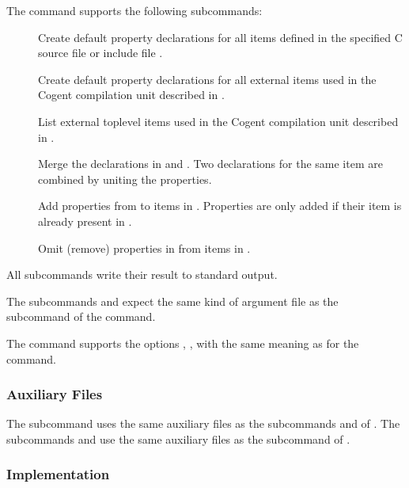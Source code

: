 The  command supports the following subcommands:
\begin{description}
\item[] Create default property declarations for all items defined in the specified C source file
or include file . 

\item[] Create default property declarations for all external items used in the Cogent compilation 
unit described in . 

\item[] List external toplevel items used in the Cogent compilation 
unit described in . 

\item[] Merge the declarations in  and . Two declarations for the 
same item are combined by uniting the properties.

\item[] Add properties from  to items in . Properties are only added
if their item is already present in .

\item[] Omit (remove) properties in  from items in . 

\end{description}

All subcommands write their result to standard output.

The subcommands  and  expect the same kind of argument file as the subcommand  
of the  command.

The  command supports the options , ,  with the same meaning as
for the  command.

\subsubsection{Auxiliary Files}

The subcommand  uses the same auxiliary files as the subcommands  and  of .
The subcommands  and  use the same auxiliary files as the subcommand  of .

\subsubsection{Implementation}

